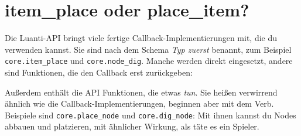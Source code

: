 \begin{Shaded}
\begin{Highlighting}[]
 \OperatorTok{=} \OperatorTok{(}\OperatorTok{,} \OperatorTok{,} \OperatorTok{,} \OperatorTok{)}
    \OperatorTok{:}\OperatorTok{(}\OperatorTok{)}
     
\end{Highlighting}
\end{Shaded}

\section{item\_place oder
place\_item?}\label{item_place-oder-place_item}

Die Luanti-API bringt viele fertige Callback-Implementierungen mit, die
du verwenden kannst. Sie sind nach dem Schema \emph{Typ zuerst} benannt,
zum Beispiel \texttt{core.\allowbreak{}item\_\allowbreak{}place} und
\texttt{core.\allowbreak{}node\_\allowbreak{}dig}.
Manche werden direkt eingesetzt, andere sind Funktionen, die den
Callback erst zurückgeben:

\begin{Shaded}
\begin{Highlighting}[]
\OperatorTok{(}\OperatorTok{,} \OperatorTok{\{}
     \OperatorTok{=} \OperatorTok{,}
     \OperatorTok{=} \OperatorTok{(}\OperatorTok{),}
\OperatorTok{\})}
\end{Highlighting}
\end{Shaded}

Außerdem enthält die API Funktionen, die etwas \emph{tun}. Sie heißen
verwirrend ähnlich wie die Callback-Implementierungen, beginnen aber mit
dem Verb. Beispiele sind
\texttt{core.\allowbreak{}place\_\allowbreak{}node}
und
\texttt{core.\allowbreak{}dig\_\allowbreak{}node}:
Mit ihnen kannst du Nodes abbauen und platzieren, mit ähnlicher Wirkung,
als täte es ein Spieler.

